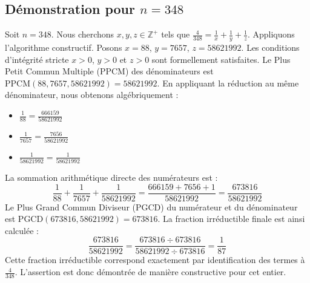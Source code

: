 \documentclass[11pt,a4paper]{article}
\begin{document}
\subsection{Démonstration pour $n = 348$}
Soit $n = 348$. Nous cherchons $x, y, z \in \mathbb{Z}^{+}$ tels que $\frac{4}{348} = \frac{1}{x} + \frac{1}{y} + \frac{1}{z}$.
Appliquons l'algorithme constructif. Posons $x = 88$, $y = 7657$, $z = 58621992$.
Les conditions d'intégrité stricte $x > 0$, $y > 0$ et $z > 0$ sont formellement satisfaites.
Le Plus Petit Commun Multiple (PPCM) des dénominateurs est $\text{PPCM}(88, 7657, 58621992) = 58621992$.
En appliquant la réduction au même dénominateur, nous obtenons algébriquement :
\begin{itemize}
    \item $\frac{1}{88} = \frac{666159}{58621992}$
    \item $\frac{1}{7657} = \frac{7656}{58621992}$
    \item $\frac{1}{58621992} = \frac{1}{58621992}$
\end{itemize}
La sommation arithmétique directe des numérateurs est :
$$ \frac{1}{88} + \frac{1}{7657} + \frac{1}{58621992} = \frac{666159 + 7656 + 1}{58621992} = \frac{673816}{58621992} $$
Le Plus Grand Commun Diviseur (PGCD) du numérateur et du dénominateur est $\text{PGCD}(673816, 58621992) = 673816$.
La fraction irréductible finale est ainsi calculée :
$$ \frac{673816}{58621992} = \frac{673816 \div 673816}{58621992 \div 673816} = \frac{1}{87} $$
Cette fraction irréductible correspond exactement par identification des termes à $\frac{4}{348}$. L'assertion est donc démontrée de manière constructive pour cet entier.
\end{document}
